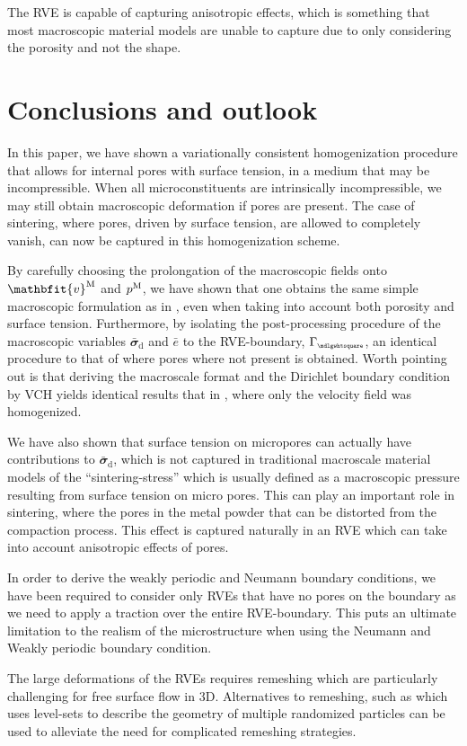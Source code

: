 \documentclass[12pt,a4paper]{article}
\renewcommand{\ta}[1]{\mathbfit{#1}}
\renewcommand{\ts}[1]{\mathbfit{#1}}
\renewcommand{\Box}{\mdlgwhtsquare}
\renewcommand{\dev}{\mathrm{d}}
\newcommand{\rve}{
  {\mathchoice
   {\mbox{\scalebox{0.67}{$\Box$}}}
   {\mbox{\scalebox{0.67}{$\Box$}}}
   {\mbox{\scalebox{0.5}{$\Box$}}}
   {\mbox{\scalebox{0.375}{$\Box$}}}
  }
}
\begin{document}
The RVE is capable of capturing anisotropic effects, which is something that most macroscopic material models are unable to capture due to only considering the porosity and not the shape.




\section{Conclusions and outlook}

In this paper, we have shown a variationally consistent homogenization procedure that allows for internal pores with surface tension, in a medium that may be incompressible.
When all microconstituents are intrinsically incompressible, we may still obtain macroscopic deformation if pores are present.
The case of sintering, where pores, driven by surface tension, are allowed to completely vanish, can now be captured in this homogenization scheme. 

By carefully choosing the prolongation of the macroscopic fields onto $\ta v^\macro$ and $p^{\mathrm{M}}$, we have shown that one obtains the same simple macroscopic formulation as in \cite{ohman_variationally_2014}, even when taking into account both porosity and surface tension.
Furthermore, by isolating the post-processing procedure of the macroscopic variables $\bar{\ts\sigma}_\dev$ and $\bar{e}$ to the RVE-boundary, $\Gamma_\rve$, an identical procedure to that of \cite{ohman_variationally_2014} where pores where not present is obtained.
Worth pointing out is that deriving the macroscale format and the Dirichlet boundary condition by VCH yields identical results that in \cite{ohman_computational_2013}, where only the velocity field was homogenized.


We have also shown that surface tension on micropores can actually have contributions to $\bar{\ts\sigma}_\dev$, which is not captured in traditional macroscale material models of the ``sintering-stress'' which is usually defined as a macroscopic pressure resulting from surface tension on micro pores.
This can play an important role in sintering, where the pores in the metal powder that can be distorted from the compaction process.
This effect is captured naturally in an RVE which can take into account anisotropic effects of pores.


In order to derive the weakly periodic and Neumann boundary conditions, we have been required to consider only RVEs that have no pores on the boundary as we need to apply a traction over the entire RVE-boundary.
This puts an ultimate limitation to the realism of the microstructure when using the Neumann and Weakly periodic boundary condition.


The large deformations of the RVEs requires remeshing which are particularly challenging for free surface flow in 3D.
Alternatives to remeshing, such as \cite{pino_munoz_direct_2013} which uses level-sets to describe the geometry of multiple randomized particles can be used to alleviate the need for complicated remeshing strategies.


\printbibliography
\end{document}
